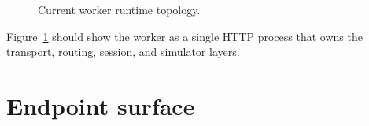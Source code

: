 \begin{figure}[htbp]
\centering
\caption{Current worker runtime topology.}
\label{fig:worker-runtime-topology}
\end{figure}

Figure~\ref{fig:worker-runtime-topology} should show the worker as a single
HTTP process that owns the transport, routing, session, and simulator layers.

\section{Endpoint surface}
\label{sec:worker-endpoints}

